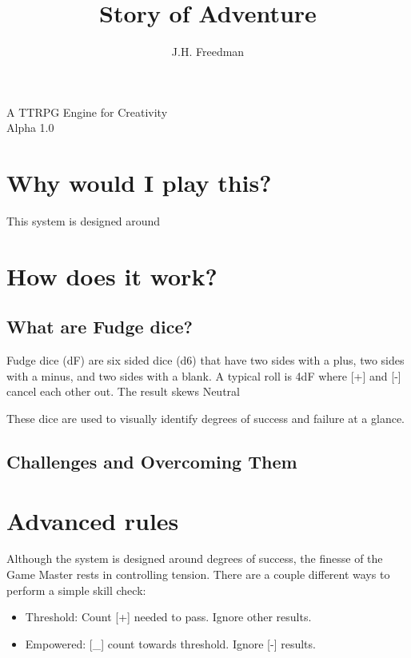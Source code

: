 \documentclass[statementpaper,oneside,article,14pt]{memoir}
\newcommand{\BackgroundPic}[1]{%
	\put(0,0){%
		\parbox[b][\paperheight]{\paperwidth}{%
			\vfill
			\centering
			{\transparent{0.4} \texttt{[image: \#1]}}%
			\vfill
}}}
\begin{document}
	
	
	\title{Story of Adventure}
	\author{J.H. Freedman}
	\date{}
	
	\begingroup
	\let\cleardoublepage\clearpage
	
	
	\begin{titlingpage}
		\maketitle
		
		A TTRPG Engine for Creativity\\Alpha 1.0
		
	\end{titlingpage}
	
	\endgroup
	
	\pagestyle{empty}
	
	
	
	\section*{Why would I play this?}
	This system is designed around 
	
	\section*{How does it work?}
	
	\subsection*{What are Fudge dice?}
	Fudge dice (dF) are six sided dice (d6) that have two sides with a plus, two sides with a minus, and two sides with a blank. A typical roll is 4dF where [+] and [-] cancel each other out. The result skews Neutral
	
	These dice are used to visually identify degrees of success and failure at a glance.
	
	\subsection*{Challenges and Overcoming Them}
		
	\section*{Advanced rules}
	Although the system is designed around degrees of success, the finesse of the Game Master rests in controlling tension. There are a couple different ways to perform a simple skill check:
	\begin{itemize}
		\item Threshold: Count [+] needed to pass. Ignore other results.
		\item Empowered: [\_] count towards threshold. Ignore [-] results.
	\end{itemize}
	
\end{document}
